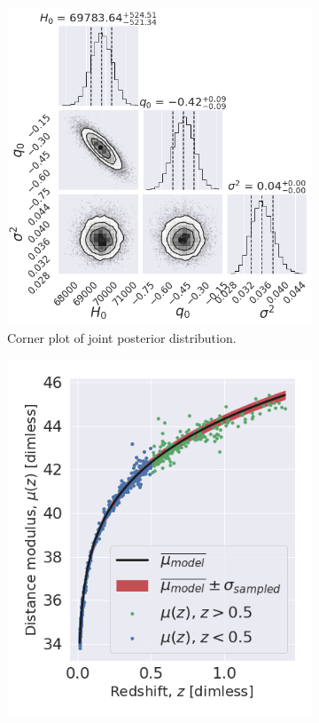 \documentclass[11pt,a4paper]{article}
\begin{document}
\begin{figure}[ht]
    \centering
    \begin{subfigure}{.55\textwidth}
          \centering
          \includegraphics[width=0.9\linewidth]{figures/corner.png}
          \caption{Corner plot of joint posterior distribution.}
          \label{fig:Joint_dist}
    \end{subfigure}%
    \begin{subfigure}{.45\textwidth}
          \centering
          \includegraphics[width=0.9\linewidth]{figures/predictive_plot_mu.png}

\end{subfigure}
\end{figure}
\end{document}
